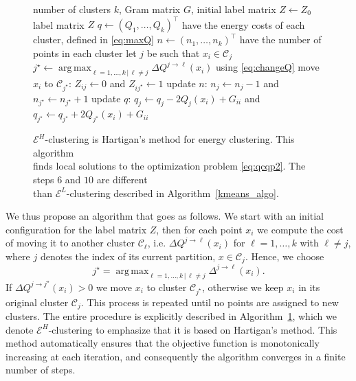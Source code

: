 \documentclass[aps,preprint,nofootinbib,floatfix]{revtex4-1}
\DeclareMathOperator*{\argmax}{arg\,max}
\newcommand\C{{\mathcal{C}}}
\begin{document}
\begin{figure}
\begin{flushleft}
\begin{algorithm}[H]
\vspace{.5em}
\begin{algorithmic}[1]
    \INPUT number of clusters $k$, Gram matrix $G$, 
                initial label matrix $Z \leftarrow Z_0$
    \OUTPUT label matrix $Z$
  \STATE $q \leftarrow (Q_1, \dotsc, Q_k)^\top$ 
            have the energy costs of each cluster, defined in \eqref{eq:maxQ}
  \STATE $n \leftarrow (n_1,\dotsc,n_k)^\top$ have the number of points 
        in each cluster%
  \REPEAT
        \STATE let $j$ be such that $x_i \in \C_j$
        \STATE $j^\star \leftarrow \argmax_{\ell=1,\dotsc,k \, | \, \ell\ne j} 
                \Delta Q^{j\to \ell}(x_i)$
            using \eqref{eq:changeQ} \label{stepmove}
            \STATE move $x_i$ to $\C_{j^\star}$: $Z_{ij} \leftarrow 0$ and 
            $Z_{ij^\star} \leftarrow 1$
            \STATE update $n$: $n_j \leftarrow n_j - 1$ and
                    $n_{j^\star} \leftarrow n_{j^\star} + 1$
            \STATE update $q$: $q_j \leftarrow q_j - 2Q_j(x_i) + G_{ii}$ and
    $q_{j^\star} \leftarrow q_{j^\star} + 2Q_{j^\star}(x_i)+ G_{ii}$
        \ENDIF
    \ENDFOR
\end{algorithmic}
\caption{\label{algo}
$\mathcal{E}^H$-clustering is Hartigan's method for energy clustering.
This algorithm~~~~~~ \\ finds local solutions to  
the optimization problem \eqref{eq:qcqp2}.
The steps $6$ and $10$ are different~~~~~~~~ \\
than $\mathcal{E}^L$-clustering
described in Algorithm~\ref{kmeans_algo}. \hspace{\fill}
}
\end{algorithm}
\end{flushleft}
\end{figure}

We thus propose an algorithm that goes as follows.
We start with an initial configuration for the label matrix $Z$, 
then for each
point $x_i$ 
we compute the cost of moving it to another cluster $\C_\ell$, i.e.
$\Delta Q^{j\to \ell}(x_i)$ for 
$\ell=1,\dots,k$ with $\ell \ne j$, where $j$ denotes the index of its current
partition, $x \in \C_j$. Hence, we choose
\begin{equation}
j^\star = \argmax_{\ell=1,\dotsc,k \, | \, \ell\ne j} 
\Delta^{j \to \ell}(x_i).
\end{equation}
If $\Delta Q^{j \to j^\star}(x_i) > 0$ 
we move $x_i$ to cluster $\C_{j^\star}$, otherwise 
we keep $x_i$ in its original cluster $\C_j$. 
This process is repeated
until no points are assigned to new clusters. 
The entire procedure is explicitly described in Algorithm~\ref{algo}, which we
denote $\mathcal{E}^H$-clustering to emphasize that it is based on
Hartigan's method.
This method automatically ensures that the objective function is
monotonically increasing at each iteration, and consequently the algorithm
converges in a finite number of steps.
\end{document}
